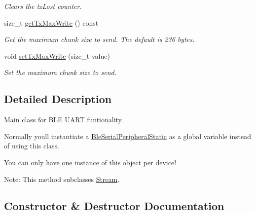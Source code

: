 \begin{DoxyCompactItemize}
\begin{DoxyCompactList}\small\item\em Clears the tx\+Lost counter. \end{DoxyCompactList}\item 
\mbox{\label{class_ble_serial_peripheral_base_aa4ca5408c166841e1fd5ea9aa3a1c4a5}} 
size\+\_\+t \mbox{\hyperlink{class_ble_serial_peripheral_base_aa4ca5408c166841e1fd5ea9aa3a1c4a5}{get\+Tx\+Max\+Write}} () const
\begin{DoxyCompactList}\small\item\em Get the maximum chunk size to send. The default is 236 bytes. \end{DoxyCompactList}\item 
void \mbox{\hyperlink{class_ble_serial_peripheral_base_a454bb53617c96d564f3e20d13765de9f}{set\+Tx\+Max\+Write}} (size\+\_\+t value)
\begin{DoxyCompactList}\small\item\em Set the maximum chunk size to send. \end{DoxyCompactList}\end{DoxyCompactItemize}


\subsection{Detailed Description}
Main class for B\+LE U\+A\+RT funtionality. 

Normally you\textquotesingle{}ll instantiate a \mbox{\hyperlink{class_ble_serial_peripheral_static}{Ble\+Serial\+Peripheral\+Static}} as a global variable instead of using this class.

You can only have one instance of this object per device!

Note\+: This method subclasses \mbox{\hyperlink{class_stream}{Stream}}. 

\subsection{Constructor \& Destructor Documentation}
\mbox{\label{class_ble_serial_peripheral_base_a1c1811adb8b03e7c0cb6e5f6c0a42fab}} 
